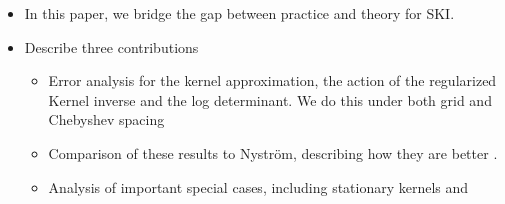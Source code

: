 \begin{itemize}
\begin{itemize}
    \end{itemize}
    \item In this paper, we bridge the gap between practice and theory for SKI.
    \item Describe three contributions
    \begin{itemize}
        \item Error analysis for the kernel approximation, the action of the regularized Kernel inverse and the log determinant. We do this under both grid and Chebyshev spacing
        \item Comparison of these results to Nystr{\"o}m, describing how they are better .
        \item Analysis of important special cases, including stationary kernels and 
    \end{itemize}
\end{itemize}


